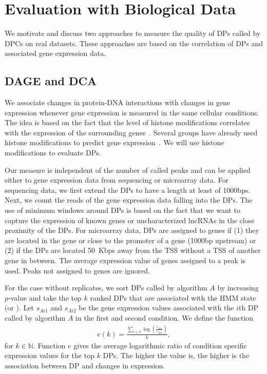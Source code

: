 \section{Evaluation with Biological Data}
We motivate and discuss two approaches to measure the quality of DPs called by DPCs on real datasets.
These approaches are based on the correlation of DPs and associated gene expression data. 

\subsection{DAGE and DCA}
\label{sec_dage_dca}
We associate changes in protein-DNA interactions with changes in gene expression whenever gene expression is measured in the same cellular conditions.
The idea is based on the fact that the level of histone modifications correlates with the expression of the surrounding genes~\citep{Karlic2010}.
Several groups have already used histone modifications to predict gene expression~\citep{Cheng2011, Maze2014}.
We will use histone modifications to evaluate DPs.

Our measure is independent of the number of called peaks and can be applied either to gene expression data from sequencing or microarray data. 
For sequencing data, we first extend the DPs to have a length at least of 1000bps. 
Next, we count the reads of the gene expression data falling into the DPs.
The use of minimum windows around DPs is based on the fact that we want to capture the expression of known genes or uncharacterized lncRNAs in the close proximity of the DPs.
For microarray data, DPs are assigned to genes if (1) they are located in the gene or close to the promoter of a gene (1000bp upstream) or (2) if the DPs are located 50~Kbps away from the TSS without a TSS of another gene in between.
The average expression value of genes assigned to a peak is used. 
Peaks not assigned to genes are ignored. 

For the case without replicates, we sort DPs called by algorithm $A$ by increasing $p$-value and take the top $k$ ranked DPs that are associated with the HMM state  (or ).
Let $s_{Ai1}$ and $s_{Ai2}$ be the gene expression values associated with the $i$th DP called by algorithm $A$ in the first and second condition.
We define the function 
\begin{align}
 e(k) = \frac{\sum_{i \leq k} \log\left(\frac{s_{Ai1}}{s_{Ai2}}\right)}{k}, \label{eq_dage_e}
\end{align}
\noindent
for $k \in \mathbb{N}$.
Function $e$ gives the average logarithmic ratio of condition specific expression values for the top $k$ DPs.
The higher the value is, the higher is the association between DP and changes in expression. 

